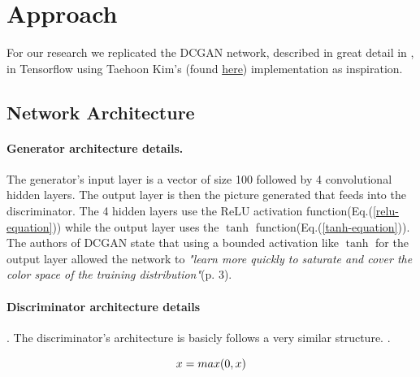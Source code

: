 
\section{Approach}
%
For our research we replicated the DCGAN network, described in great detail in \cite{DBLP:journals/corr/RadfordMC15}, in Tensorflow using Taehoon Kim's (found \href{https://github.com/carpedm20/DCGAN-tensorflow}{here}) implementation as inspiration. \\
\subsection{Network Architecture}
\paragraph{Generator architecture details.} The generator's input layer is a vector of size 100 followed by 4 convolutional hidden layers. The output layer is then the picture generated that feeds into the discriminator. The 4 hidden layers use the ReLU activation function(Eq.(\ref{relu-equation})) while the output layer uses the $\tanh$ function(Eq.(\ref{tanh-equation})). The authors of DCGAN state that using a bounded activation like $\tanh$ for the output layer allowed the network to \textit{"learn more quickly to saturate and cover the color space of the training distribution"}(p. 3).
\paragraph{Discriminator architecture details}. The discriminator's architecture is basicly follows a very similar structure. .

\begin{equation}
\label{relu-equation}
x = max(0, x)\\
\end{equation}


